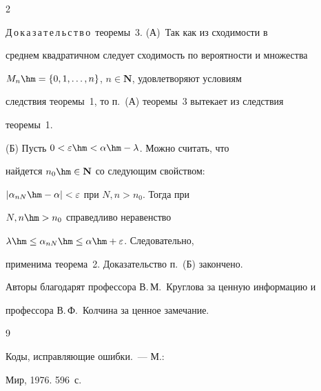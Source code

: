 \begin{multicols}{2}
\medskip





\noindent


Д\,о\,к\,а\,з\,а\,т\,е\,л\,ь\,с\,т\,в\,о\  теоремы~3. (А)~Так как из сходимости в


среднем квадратичном следует сходимость по вероятности и множества


$M_n\hm=\{0, 1,\dots, n\}$, $n\in\mathbf{N}$, удовлетворяют условиям


следствия теоремы~1, то п.~(А) теоремы~3 вытекает из следствия


теоремы~1.





(Б) Пусть $0<\varepsilon\hm<\alpha\hm-\lambda$. Можно считать, что


найдется $n_0\hm\in\mathbf{N}$ со следующим свойством:


$|\alpha_{nN}\hm-\alpha|<\varepsilon$ при $N,n>n_0$. Тогда  при


$N,n\hm>n_0$ справедливо неравенство


$\lambda\hm\le\alpha_{nN}\hm\le\alpha\hm+\varepsilon$. Следовательно,


применима теорема~2. Доказательство п.~(Б) закончено.





\bigskip





Авторы благодарят профессора В.\,М.~Круглова за ценную информацию и


профессора В.\,Ф.~Колчина за ценное замечание.





  {\small\frenchspacing


{%




\begin{thebibliography}{9}







 Коды, исправляющие ошибки.~--- М.:


Мир, 1976. 596~с.








\end{thebibliography}}}
\end{multicols}
